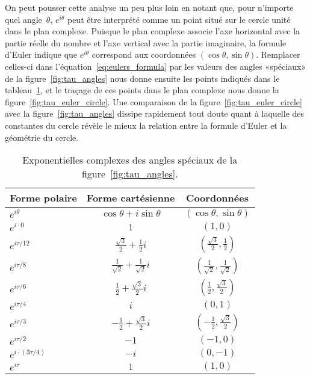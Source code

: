 On peut pousser cette analyse un peu plus loin en notant que, pour n'importe
quel angle~$\theta$, $e^{i\theta}$ peut être interprété comme un point situé sur
le cercle unité dans le plan complexe. Puisque le plan complexe associe l'axe
horizontal avec la partie réelle du nombre et l'axe vertical avec la partie
imaginaire, la formule d'Euler indique que $e^{i\theta}$ correspond aux
coordonnées $(\cos\theta,\sin\theta)$. Remplacer celles-ci dans
l'équation~\eqref{eq:eulers_formula} par les valeurs des angles «\ns spéciaux\ns »
de la figure~\ref{fig:tau_angles} nous donne ensuite les points indiqués dans le
tableau~\ref{table:complex_exponentials}, et le traçage de ces points dans le
plan complexe nous donne la figure~\ref{fig:tau_euler_circle}. Une comparaison de la
figure~\ref{fig:tau_euler_circle} avec la figure~\ref{fig:tau_angles} dissipe
rapidement tout doute quant à laquelle des constantes du cercle révèle le
mieux la relation entre la formule d'Euler et la géométrie du cercle.

\begin{table}
\begin{center}
\begin{tabular}{lcc}
Forme polaire & Forme cartésienne & Coordonnées \\ \hline\hline
$e^{i\theta}$ & $\cos\theta + i\sin\theta$ & $(\cos\theta, \sin\theta)$ \\ \hline
$e^{i\cdot0}$ & $1$ & $(1, 0)$ \smallskip \\
$e^{i\tau/12}$ & $\frac{\sqrt{3}}{2} + \frac{1}{2}i$ & $(\frac{\sqrt{3}}{2}, \frac{1}{2})$ \smallskip \\
$e^{i\tau/8}$ & $\frac{1}{\sqrt{2}} +  \frac{1}{\sqrt{2}}i$ & $(\frac{1}{\sqrt{2}}, \frac{1}{\sqrt{2}})$ \smallskip \\
$e^{i\tau/6}$ & $\frac{1}{2} +\frac{\sqrt{3}}{2} i$ & $(\frac{1}{2}, \frac{\sqrt{3}}{2})$ \smallskip \\
$e^{i\tau/4}$ & $i$ & $(0, 1)$ \smallskip \\
$e^{i\tau/3}$ & $-\frac{1}{2} +\frac{\sqrt{3}}{2} i$ & $(-\frac{1}{2}, \frac{\sqrt{3}}{2})$ \smallskip \\
$e^{i\tau/2}$ & $-1$ & $(-1, 0)$ \smallskip \\
$e^{i\cdot(3\tau/4)}$ & $-i$ & $(0, -1)$ \smallskip \\
$e^{i\tau}$ & $1$ & $(1, 0)$
\end{tabular}
\end{center}
\caption{Exponentielles complexes des angles spéciaux de la
figure~\ref{fig:tau_angles}.\label{table:complex_exponentials}}
\end{table}

